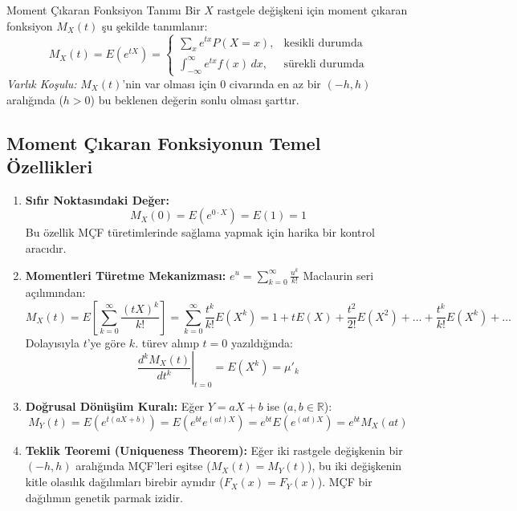 \documentclass[12pt,a4paper]{article}
\begin{document}
\begin{tanim}{Moment Çıkaran Fonksiyon Tanımı}
Bir $X$ rastgele değişkeni için moment çıkaran fonksiyon $M_X(t)$ şu şekilde tanımlanır:
\begin{equation}
    M_X(t) = E(e^{tX}) = 
    \begin{cases}
        \sum_x e^{tx} P(X = x), & \text{kesikli durumda} \\[0.5em]
        \int_{-\infty}^{\infty} e^{tx} f(x) \, dx, & \text{sürekli durumda}
    \end{cases}
\end{equation}
\textit{Varlık Koşulu:} $M_X(t)$'nin var olması için $0$ civarında en az bir $(-h, h)$ aralığında ($h > 0$) bu beklenen değerin sonlu olması şarttır.
\end{tanim}

\subsection{Moment Çıkaran Fonksiyonun Temel Özellikleri}
\begin{enumerate}
    \item \textbf{Sıfır Noktasındaki Değer:}
    \begin{equation}
        M_X(0) = E(e^{0 \cdot X}) = E(1) = 1
    \end{equation}
    Bu özellik MÇF türetimlerinde sağlama yapmak için harika bir kontrol aracıdır.

    \item \textbf{Momentleri Türetme Mekanizması:}
    $e^u = \sum_{k=0}^\infty \frac{u^k}{k!}$ Maclaurin seri açılımından:
    \begin{equation}
        M_X(t) = E\left[ \sum_{k=0}^\infty \frac{(tX)^k}{k!} \right] = \sum_{k=0}^\infty \frac{t^k}{k!} E(X^k) = 1 + t E(X) + \frac{t^2}{2!} E(X^2) + \dots + \frac{t^k}{k!} E(X^k) + \dots
    \end{equation}
    Dolayısıyla $t$'ye göre $k$. türev alınıp $t=0$ yazıldığında:
    \begin{equation}
        \left. \frac{d^k M_X(t)}{dt^k} \right|_{t=0} = E(X^k) = \mu'_k
    \end{equation}

    \item \textbf{Doğrusal Dönüşüm Kuralı:}
    Eğer $Y = aX + b$ ise ($a, b \in \mathbb{R}$):
    \begin{equation}
        M_Y(t) = E(e^{t(aX+b)}) = E(e^{bt} e^{(at)X}) = e^{bt} E(e^{(at)X}) = e^{bt} M_X(at)
    \end{equation}

    \item \textbf{Teklik Teoremi (Uniqueness Theorem):}
    Eğer iki rastgele değişkenin bir $(-h, h)$ aralığında MÇF'leri eşitse ($M_X(t) = M_Y(t)$), bu iki değişkenin kitle olasılık dağılımları birebir aynıdır ($F_X(x) = F_Y(x)$). MÇF bir dağılımın genetik parmak izidir.
\end{enumerate}
\end{document}
